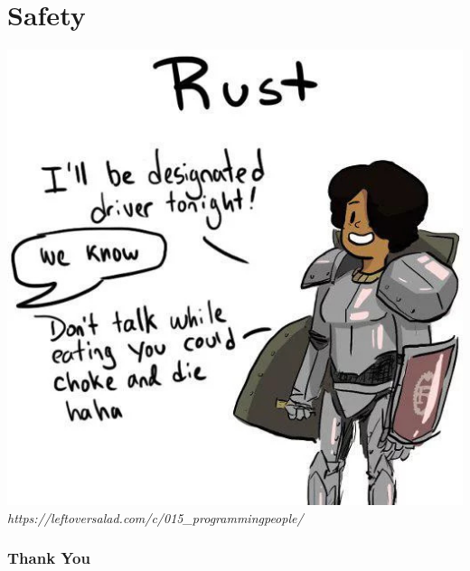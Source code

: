 \documentclass{beamer}
\begin{document}
\section{Safety}
\begin{frame}
    \begin{center}
        \includegraphics[scale=0.3]{images/rust-taxi.jpg} \\
        \tiny \textit{https://leftoversalad.com/c/015\_programmingpeople/}
    \end{center}
\end{frame}
\begin{frame}
    \frametitle{Thank You}
\end{frame}
\end{document}
